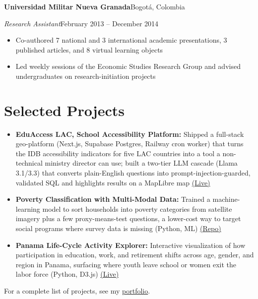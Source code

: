 \documentclass[10pt]{article}
\newcommand{\org}[2]{\noindent\textbf{#1}\hfill #2\par\vspace{0pt}}
\newcommand{\role}[2]{\noindent\textit{#1}\hfill #2\par\vspace{0pt}}
\newenvironment{cvitems}{%
  \begin{itemize}[
    leftmargin=1.2em,
    itemsep=0pt,
    parsep=0pt,
    topsep=1pt,
    label={$\bullet$}]%
}{\end{itemize}}
\newcommand{\entrygap}{\vspace{6pt}}
\begin{document}
\entrygap
\org{Universidad Militar Nueva Granada}{Bogot\'a, Colombia}
\role{Research Assistant}{February 2013 -- December 2014}
\vspace{-1pt}
\begin{cvitems}
  \item Co-authored 7 national and 3 international academic presentations, 3 published articles, and 8 virtual learning objects
  \item Led weekly sessions of the Economic Studies Research Group and advised undergraduates on research-initiation projects
\end{cvitems}

\section{Selected Projects}

\begin{cvitems}
  \item \textbf{EduAccess LAC, School Accessibility Platform:} Shipped a full-stack geo-platform (Next.js, Supabase Postgres, Railway cron worker) that turns the IDB accessibility indicators for five LAC countries into a tool a non-technical ministry director can use; built a two-tier LLM cascade (Llama 3.1/3.3) that converts plain-English questions into prompt-injection-guarded, validated SQL and highlights results on a MapLibre map \href{https://eduaccess-lac.vercel.app/}{(Live)}
  \item \textbf{Poverty Classification with Multi-Modal Data:} Trained a machine-learning model to sort households into poverty categories from satellite imagery plus a few proxy-means-test questions, a lower-cost way to target social programs where survey data is missing (Python, ML) \href{https://github.com/uchicago-capp30254-spr-25/project-alopezsanchez-cnunezh-jmcarias}{(Repo)}
  \item \textbf{Panama Life-Cycle Activity Explorer:} Interactive visualization of how participation in education, work, and retirement shifts across age, gender, and region in Panama, surfacing where youth leave school or women exit the labor force (Python, D3.js) \href{https://angelalop.github.io/capp30239_interactive_viz/}{(Live)}
\end{cvitems}

\vspace{2pt}
For a complete list of projects, see my \href{https://angelalop.github.io/AngelaLopezS/}{portfolio}.
\end{document}
